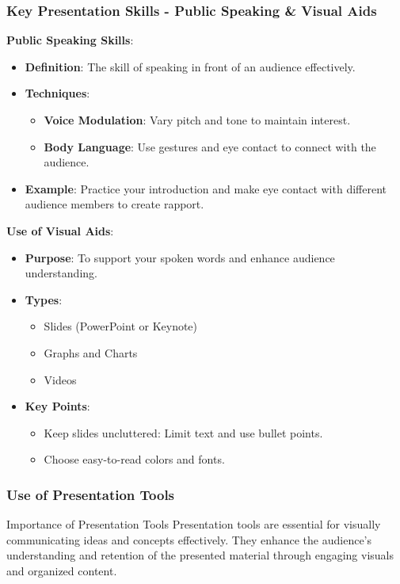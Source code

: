 \documentclass{beamer}
\begin{document}
\begin{frame}[fragile]
    \frametitle{Key Presentation Skills - Public Speaking & Visual Aids}
    \textbf{Public Speaking Skills}:
    \begin{itemize}
        \item \textbf{Definition}: The skill of speaking in front of an audience effectively.
        \item \textbf{Techniques}:
        \begin{itemize}
            \item \textbf{Voice Modulation}: Vary pitch and tone to maintain interest.
            \item \textbf{Body Language}: Use gestures and eye contact to connect with the audience.
        \end{itemize}
        \item \textbf{Example}: Practice your introduction and make eye contact with different audience members to create rapport.
    \end{itemize}

    \textbf{Use of Visual Aids}:
    \begin{itemize}
        \item \textbf{Purpose}: To support your spoken words and enhance audience understanding.
        \item \textbf{Types}:
        \begin{itemize}
            \item Slides (PowerPoint or Keynote)
            \item Graphs and Charts
            \item Videos
        \end{itemize}
        \item \textbf{Key Points}:
        \begin{itemize}
            \item Keep slides uncluttered: Limit text and use bullet points.
            \item Choose easy-to-read colors and fonts.
        \end{itemize}
    \end{itemize}
\end{frame}

\begin{frame}[fragile]
    \frametitle{Use of Presentation Tools}
    \begin{block}{Importance of Presentation Tools}
        Presentation tools are essential for visually communicating ideas and concepts effectively. They enhance the audience's understanding and retention of the presented material through engaging visuals and organized content.
    \end{block}
\end{frame}
\end{document}
